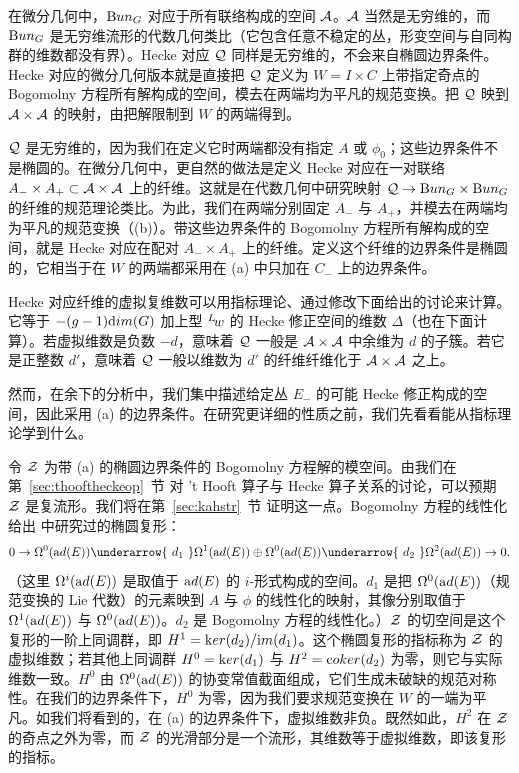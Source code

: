 在微分几何中，${\rm Bun}_G$ 对应于所有联络构成的空间 $\EUA$。$\EUA$ 当然是无穷维的，而 ${\rm Bun}_G$ 是无穷维流形的代数几何类比（它包含任意不稳定的丛，形变空间与自同构群的维数都没有界）。Hecke 对应 ${\cal Q}$ 同样是无穷维的，不会来自椭圆边界条件。Hecke 对应的微分几何版本就是直接把 ${\cal Q}$ 定义为 $W=I\times C$ 上带指定奇点的 Bogomolny 方程所有解构成的空间，模去在两端均为平凡的规范变换。把 ${\cal Q}$ 映到 $\EUA\times \EUA$ 的映射，由把解限制到 $W$ 的两端得到。

${\cal Q}$ 是无穷维的，因为我们在定义它时两端都没有指定 $A$ 或 $\phi_0$；这些边界条件不是椭圆的。在微分几何中，更自然的做法是定义 Hecke 对应在一对联络 $A_-\times A_+\subset \EUA\times \EUA$ 上的纤维。这就是在代数几何中研究映射 ${\cal Q}\to {\rm Bun}_G\times {\rm Bun}_G$ 的纤维的规范理论类比。为此，我们在两端分别固定 $A_-$ 与 $A_+$，并模去在两端均为平凡的规范变换（\utampo(b)）。带这些边界条件的 Bogomolny 方程所有解构成的空间，就是 Hecke 对应在配对 $A_-\times A_+$ 上的纤维。定义这个纤维的边界条件是椭圆的，它相当于在 $W$ 的两端都采用在 \utampo(a) 中只加在 $C_-$ 上的边界条件。

Hecke 对应纤维的虚拟复维数可以用指标理论、通过修改下面给出的讨论来计算。它等于 $-(g-1){\rm dim}(G)$ 加上型 $^L\negthinspace w$ 的 Hecke 修正空间的维数 $\Delta$（也在下面计算）。若虚拟维数是负数 $-d$，意味着 ${\cal Q}$ 一般是 $\EUA\times \EUA$ 中余维为 $d$ 的子簇。若它是正整数 $d'$，意味着 ${\cal Q}$ 一般以维数为 $d'$ 的纤维纤维化于 $\EUA\times \EUA$ 之上。

然而，在余下的分析中，我们集中描述给定丛 $E_-$ 的可能 Hecke 修正构成的空间，因此采用 \utampo(a) 的边界条件。在研究更详细的性质之前，我们先看看能从指标理论学到什么。

\par{}

令 ${\EUZ}$ 为带 \utampo(a) 的椭圆边界条件的 Bogomolny 方程解的模空间。由我们在第~\ref{sec:thooftheckeop}~节 对 't Hooft 算子与 Hecke 算子关系的讨论，可以预期 ${\EUZ}$ 是复流形。我们将在第~\ref{sec:kahstr}~节 证明这一点。Bogomolny 方程的线性化给出 \cite{ref107,ref108} 中研究过的椭圆复形：
\setcounter{equation}{0}
\begin{equation}\label{eq:tifor}
0\to \Omega^0({\rm
ad}(E))\underarrow{~d_1~}\Omega^1({\rm ad}(E))\oplus \Omega^0({\rm
ad}(E))\underarrow{~d_2~}\Omega^2({\rm ad}(E))\to 0 .
\end{equation}
（这里 $\Omega^i({\rm ad}(E))$ 是取值于 ${\rm ad}(E)$ 的 $i$-形式构成的空间。$d_1$ 是把 $\Omega^0({\rm ad}(E))$（规范变换的 Lie 代数）的元素映到 $A$ 与 $\phi$ 的线性化的映射，其像分别取值于 $\Omega^1({\rm ad}(E))$ 与 $\Omega^0({\rm ad}(E))$。$d_2$ 是 Bogomolny 方程的线性化。）${\EUZ}$ 的切空间是这个复形的一阶上同调群，即 $ H^1={\rm ker}(d_2)/{\rm im}(d_1)$。这个椭圆复形的指标称为 ${\EUZ}$ 的虚拟维数；若其他上同调群 $H^0={\rm ker}(d_1)$ 与 $H^2={\rm coker}(d_2)$ 为零，则它与实际维数一致。$H^0$ 由 $\Omega^0({\rm ad}(E))$ 的协变常值截面组成，它们生成未破缺的规范对称性。在我们的边界条件下，$H^0$ 为零，因为我们要求规范变换在 $W$ 的一端为平凡。如我们将看到的，在 \utampo(a) 的边界条件下，虚拟维数非负。既然如此，$H^2$ 在 ${\EUZ}$ 的奇点之外为零，而 ${\EUZ}$ 的光滑部分是一个流形，其维数等于虚拟维数，即该复形的指标。

